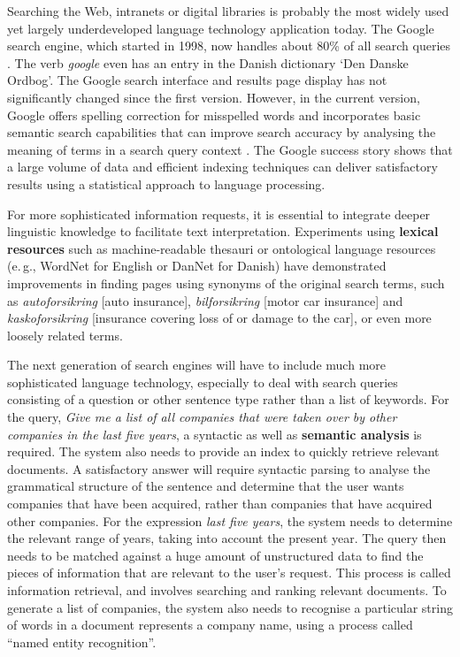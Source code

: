 \begin{multicols}{2}
Searching the Web, intranets or digital libraries is probably the most widely used yet largely underdeveloped language technology application today. The Google search engine, which started in 1998, now handles about 80\% of all search queries \cite{spi1}. The verb {\it google} even has an entry in the Danish dictionary `Den Danske Ordbog'. The Google search interface and results page display has not significantly changed since the first version. However, in the current version, Google offers spelling correction for misspelled words and incorporates basic semantic search capabilities that can improve search accuracy by analysing the meaning of terms in a search query context \cite{pc1}. The Google success story shows that a large volume of data and efficient indexing techniques can deliver satisfactory results using a statistical approach to language processing. 

For more sophisticated information requests, it is essential to integrate deeper linguistic knowledge to facilitate text interpretation. Experiments using \textbf{lexical resources} such as machine-readable thesauri or ontological language resources (e.\,g., WordNet for English or DanNet for Danish) have demonstrated improvements in finding pages using synonyms of the original search terms, such as \textit{autoforsikring} {[}auto insurance{]}, \textit{bilforsikring} {[}motor car insurance{]} and \textit{kaskoforsikring} {[}insurance covering loss of or damage to the car{]}, or even more loosely related terms.


The next generation of search engines will have to include much more sophisticated language technology, especially to deal with search queries consisting of a question or other sentence type rather than a list of keywords. For the query, \textit{Give me a list of all companies that were taken over by other companies in the last five years}, a syntactic as well as \textbf{semantic analysis} is required. The system also needs to provide an index to quickly retrieve relevant documents. A satisfactory answer will require syntactic parsing to analyse the grammatical structure of the sentence and determine that the user wants companies that have been acquired, rather than companies that have acquired other companies. For the expression \textit{last five years}, the system needs to determine the relevant range of years, taking into account the present year. The query then needs to be matched against a huge amount of unstructured data to find the pieces of information that are relevant to the user’s request. This process is called information retrieval, and involves searching and ranking relevant documents. To generate a list of companies, the system also needs to recognise a particular string of words in a document represents a company name, using a process called ``named entity recognition''.


\end{multicols}
